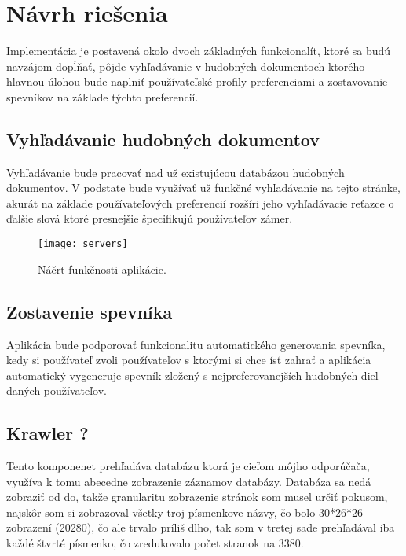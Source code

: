 \newpage

\section{Návrh riešenia}

Implementácia je postavená okolo dvoch základných funkcionalít,
ktoré sa budú navzájom dopĺňať,
pôjde vyhľadávanie v hudobných dokumentoch
ktorého hlavnou úlohou bude naplniť používateľské profily
preferenciami a zostavovanie spevníkov na základe týchto preferencií. 

\subsection{Vyhľadávanie hudobných dokumentov}

Vyhľadávanie bude pracovať nad už existujúcou databázou hudobných dokumentov.
V podstate bude využívať už funkčné vyhľadávanie na tejto stránke,
akurát na základe používateľových preferencií
rozšíri jeho vyhľadávacie reťazce o ďalšie slová ktoré presnejšie špecifikujú používateľov zámer.

\begin{figure}\begin{center}\texttt{[image: servers]}
\caption{Náčrt funkčnosti aplikácie.}\label{Náčrt funkčnosti aplikácie}
\end{center}\end{figure}

\subsection{Zostavenie spevníka}

Aplikácia bude podporovať funkcionalitu automatického generovania spevníka,
kedy si používateľ zvoli používateľov s ktorými si chce ísť zahrať
a aplikácia automatický vygeneruje spevník
zložený s nejpreferovanejších hudobných diel daných používateľov.

\subsection{Krawler ?}

Tento komponenet prehľadáva databázu ktorá je cieľom môjho odporúčača,
využíva k tomu abecedne zobrazenie záznamov databázy.
Databáza sa nedá zobraziť od do,
takže granularitu zobrazenie stránok som musel určiť pokusom,
najskôr som si zobrazoval všetky troj písmenkove názvy,
čo bolo 30*26*26 zobrazení (20280), čo ale trvalo príliš dlho,
tak som v tretej sade prehľadával iba každé štvrté písmenko,
čo zredukovalo počet stranok na 3380.

